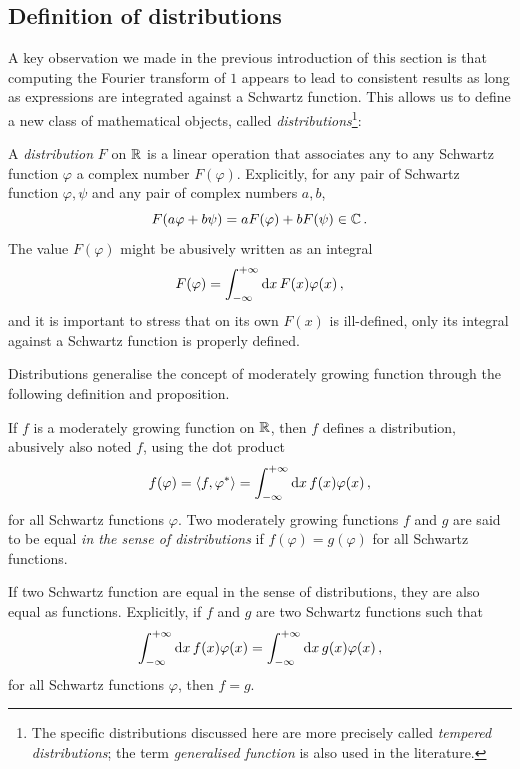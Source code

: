 \subsection{Definition of distributions}
A key observation we made in the previous introduction of this section is that computing
the Fourier transform of $1$ appears to lead to consistent results as long as expressions
are integrated against a Schwartz function. This allows us to define a new class of
mathematical objects, called \emph{distributions}\footnote{The specific distributions
	discussed here are more precisely called \emph{tempered distributions}; the term
	\emph{generalised function} is also used in the literature.}:
\begin{definition}
	A \emph{distribution} $F$ on $\mathbb{R}$ is a linear operation that associates any to any
	Schwartz function $\varphi$ a complex number $F(\varphi)$. Explicitly, for any pair of
	Schwartz function $\varphi,\psi$ and any pair of complex numbers $a,b$,
	\begin{equation}
		F(a\varphi+b\psi)=aF(\varphi)+bF(\psi)\in\mathbb{C}\,.
	\end{equation}
	The value $F(\varphi)$ might be abusively written as an integral
	\begin{equation}
		F(\varphi)=\int_{-\infty}^{+\infty}\mathrm{d}{x}\,F(x)\varphi(x)\,,
	\end{equation}
	and it is important to stress that on its own $F(x)$ is ill-defined, only its integral
	against a Schwartz function is properly defined.
\end{definition}
Distributions generalise the concept of moderately growing function through the following
definition and proposition.
\begin{definition}
	If $f$ is a moderately growing function on $\mathbb{R}$, then $f$ defines a distribution,
	abusively also noted $f$, using the dot product
	\begin{equation}
		f(\varphi)=\braket{f,\varphi^*}=\int_{-\infty}^{+\infty}\mathrm{d}{x}\,f(x)\varphi(x)\,,
	\end{equation}
	for all Schwartz functions $\varphi$. Two moderately growing functions $f$ and $g$ are
	said to be equal \emph{in the sense of distributions} if $f(\varphi)=g(\varphi)$ for all
	Schwartz functions.
\end{definition}
\begin{proposition}
	If two Schwartz function are equal in the sense of distributions, they are also equal as
	functions. Explicitly, if $f$ and $g$ are two Schwartz functions such that
	\begin{equation}
		\int_{-\infty}^{+\infty}\mathrm{d}{x}\,f(x)\varphi(x)=\int_{-\infty}^{+\infty}\mathrm{d}{x}\,g(x)\varphi(x)\,,
	\end{equation}
	for all Schwartz functions $\varphi$, then $f=g$.
\end{proposition}
